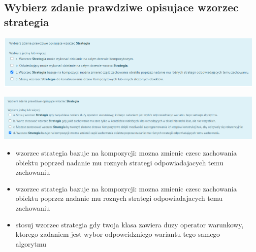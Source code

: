 \documentclass[11pt]{article}
\begin{document}
\subsection{Wybierz zdanie prawdziwe opisujace wzorzec strategia}
\label{sec:org2260921}
\begin{center}
\includegraphics[width=.9\linewidth]{./zadanie2.png}
\end{center}
\begin{center}
\includegraphics[width=.9\linewidth]{./zadanie10.png}
\end{center}
\begin{itemize}
\item wzorzec strategia bazuje na kompozycji: mozna zmienic czesc zachowania obiektu poprzed nadanie mu roznych strategi odpowiadajacych temu zachowaniu
\item wzorzec strategia bazuje na kompozycji: mozna zmienic czesc zachowania obiektu poprzez nadanie mu roznych strategi odpowiadajacych temu zachowaniu
\item stosuj wzorzec strategia gdy twoja klasa zawiera duzy operator warunkowy, ktorego zadaniem jest wybor odpoweidzniego wariantu tego samego algorytmu
\end{itemize}
\end{document}
